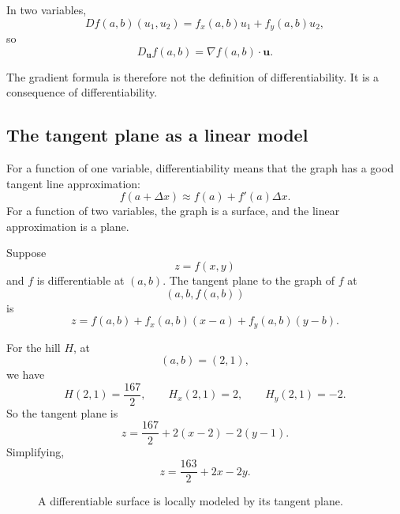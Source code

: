 In two variables,
\[
    Df(a,b)(u_1,u_2)
    =
    f_x(a,b)u_1+f_y(a,b)u_2,
\]
so
\[
\boxed{
    D_{\mathbf u}f(a,b)
    =
    \nabla f(a,b)\cdot\mathbf u.
}
\]

The gradient formula is therefore not the definition of differentiability.  It is a
consequence of differentiability.

\subsection{The tangent plane as a linear model}

For a function of one variable, differentiability means that the graph has a good tangent
line approximation:
\[
    f(a+\Delta x)\approx f(a)+f'(a)\Delta x.
\]
For a function of two variables, the graph is a surface, and the linear approximation is
a plane.

\begin{definition}
Suppose
\[
    z=f(x,y)
\]
and \(f\) is differentiable at \((a,b)\).  The tangent plane to the graph of \(f\) at
\[
    (a,b,f(a,b))
\]
is
\[
\boxed{
    z=
    f(a,b)+f_x(a,b)(x-a)+f_y(a,b)(y-b).
}
\]
\end{definition}

For the hill \(H\), at
\[
    (a,b)=(2,1),
\]
we have
\[
    H(2,1)=\frac{167}{2},
    \qquad
    H_x(2,1)=2,
    \qquad
    H_y(2,1)=-2.
\]
So the tangent plane is
\[
    z=\frac{167}{2}+2(x-2)-2(y-1).
\]
Simplifying,
\[
\boxed{
    z=\frac{163}{2}+2x-2y.
}
\]

\begin{figure}[h]
\centering
{}
\caption{A differentiable surface is locally modeled by its tangent plane.}
\end{figure}

